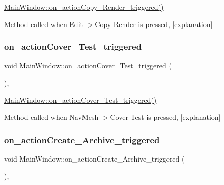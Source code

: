 \hyperlink{class_main_window_a5e9b919e05294457c7ea69f11afa0af8}{Main\+Window\+::on\+\_\+action\+Copy\+\_\+\+Render\+\_\+triggered()} 

Method called when Edit-\/$>$Copy Render is pressed, \mbox{[}explanation\mbox{]} \mbox{\label{class_main_window_a490e7af6d6dfb464cefc5e6ae65c6ab3}} 
\subsubsection{\texorpdfstring{on\+\_\+action\+Cover\+\_\+\+Test\+\_\+triggered}{on\_actionCover\_Test\_triggered}}
{\footnotesize\ttfamily void Main\+Window\+::on\+\_\+action\+Cover\+\_\+\+Test\+\_\+triggered (\begin{DoxyParamCaption}{ }\end{DoxyParamCaption})\hspace{0.3cm}{\ttfamily [private]}, {\ttfamily [slot]}}



\hyperlink{class_main_window_a490e7af6d6dfb464cefc5e6ae65c6ab3}{Main\+Window\+::on\+\_\+action\+Cover\+\_\+\+Test\+\_\+triggered()} 

Method called when Nav\+Mesh-\/$>$Cover Test is pressed, \mbox{[}explanation\mbox{]} \mbox{\label{class_main_window_a6ac0bcf0b051abe049c84075e0a5d13a}} 
\subsubsection{\texorpdfstring{on\+\_\+action\+Create\+\_\+\+Archive\+\_\+triggered}{on\_actionCreate\_Archive\_triggered}}
{\footnotesize\ttfamily void Main\+Window\+::on\+\_\+action\+Create\+\_\+\+Archive\+\_\+triggered (\begin{DoxyParamCaption}{ }\end{DoxyParamCaption})\hspace{0.3cm}{\ttfamily [private]}, {\ttfamily [slot]}}



